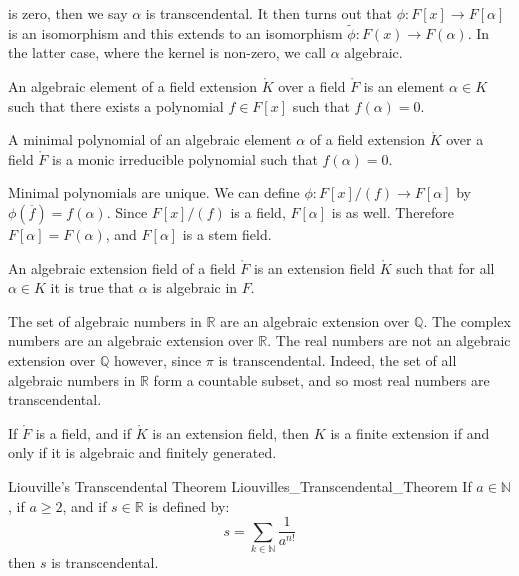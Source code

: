     is zero, then we say $\alpha$ is transcendental. It then turns out that
    $\phi:F[x]\rightarrow{F}[\alpha]$ is an isomorphism and this extends
    to an isomorphism $\tilde{\phi}:F(x)\rightarrow{F}(\alpha)$. In the
    latter case, where the kernel is non-zero, we call $\alpha$ algebraic.
    \begin{definition}
        An algebraic element of a field extension $\ring{K}$ over a field
        $\ring{F}$ is an element $\alpha\in{K}$ such that there exists a
        polynomial $f\in{F}[x]$ such that $f(\alpha)=0$.
    \end{definition}
    \begin{definition}
        A minimal polynomial of an algebraic element $\alpha$ of a field
        extension $\ring{K}$ over a field $\ring{F}$ is a monic irreducible
        polynomial such that $f(\alpha)=0$.
    \end{definition}
    Minimal polynomials are unique. We can define
    $\phi:F[x]/(f)\rightarrow{F}[\alpha]$ by
    $\phi(\overline{f})=f(\alpha)$. Since $F[x]/(f)$ is a field, $F[\alpha]$
    is as well. Therefore $F[\alpha]=F(\alpha)$, and $F[\alpha]$ is a stem
    field.
    \begin{definition}
        An algebraic extension field of a field $\ring{F}$ is an extension
        field $\ring{K}$ such that for all $\alpha\in{K}$ it is true that
        $\alpha$ is algebraic in $F$.
    \end{definition}
    \begin{example}
        The set of algebraic numbers in $\mathbb{R}$ are an algebraic
        extension over $\mathbb{Q}$. The complex numbers are an algebraic
        extension over $\mathbb{R}$. The real numbers are not an algebraic
        extension over $\mathbb{Q}$ however, since $\pi$ is transcendental.
        Indeed, the set of all algebraic numbers in $\mathbb{R}$ form a
        countable subset, and so most real numbers are transcendental.
    \end{example}
    \begin{theorem}
        If $\ring{F}$ is a field, and if $\ring{K}$ is an extension field,
        then $K$ is a finite extension if and only if it is algebraic and
        finitely generated.
    \end{theorem}
    \begin{ftheorem}{Liouville's Transcendental Theorem}
                    {Liouvilles_Transcendental_Theorem}
        If $a\in\mathbb{N}$, if $a\geq{2}$, and if $s\in\mathbb{R}$ is
        defined by:
        \begin{equation}
            s=\sum_{k\in\mathbb{N}}\frac{1}{a^{n!}}
        \end{equation}
        then $s$ is transcendental.
    \end{ftheorem}
